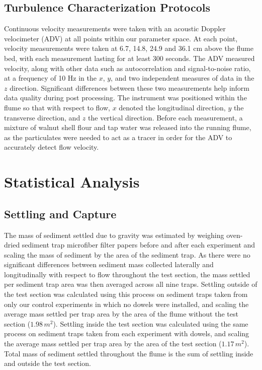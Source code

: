\documentclass{scrreprt}
\begin{document}
\subsection{Turbulence Characterization Protocols}
Continuous velocity measurements were taken with an acoustic Doppler velocimeter (ADV) at all points within our parameter space. At each point, velocity measurements were taken at 6.7, 14.8, 24.9 and 36.1 cm above the flume bed, with each measurement lasting for at least 300 seconds. The ADV measured velocity, along with other data such as autocorrelation and signal-to-noise ratio, at a frequency of 10 Hz in the $x$, $y$, and two independent measures of data in the $z$ direction. Significant differences between these two measurements help inform data quality during post processing. The instrument was positioned within the flume so that with respect to flow, $x$ denoted the longitudinal direction, $y$ the transverse direction, and $z$ the vertical direction. Before each measurement, a mixture of walnut shell flour and tap water was released into the running flume, as the particulates were needed to act as a tracer in order for the ADV to accurately detect flow velocity.

\section{Statistical Analysis}

\subsection{Settling and Capture}
The mass of sediment settled due to gravity was estimated by weighing oven-dried sediment trap microfiber filter papers before and after each experiment and scaling the mass of sediment by the area of the sediment trap. As there were no significant differences between sediment mass collected laterally and longitudinally with respect to flow throughout the test section, the mass settled per sediment trap area was then averaged across all nine traps. Settling outside of the test section was calculated using this process on sediment traps taken from only our control experiments in which no dowels were installed, and scaling the average mass settled per trap area by the area of the flume without the test section ($1.98\, m^{2}$). Settling inside the test section was calculated using the same process on sediment traps taken from each experiment with dowels, and scaling the average mass settled per trap area by the area of the test section ($1.17\, m^{2}$). Total mass of sediment settled throughout the flume is the sum of settling inside and outside the test section.
\end{document}
